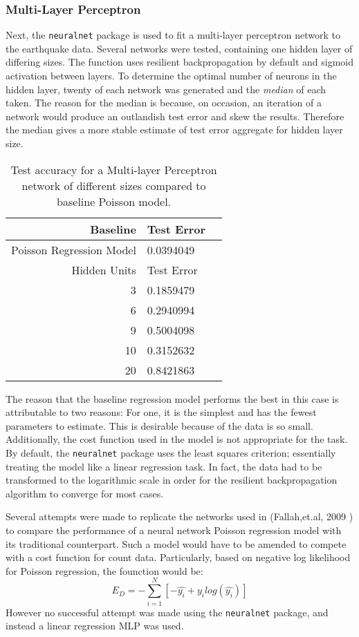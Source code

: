 
\subsubsection{Multi-Layer Perceptron}

Next, the \texttt{neuralnet} package \cite{neuralnet} is used to fit a multi-layer perceptron network to the earthquake data.  Several networks were tested, containing one hidden layer of differing sizes.  The function uses resilient backpropagation by default and sigmoid activation between layers.  To determine the optimal number of neurons in the hidden layer, twenty of each network was generated and the \textit{median} of each taken.  The reason for the median is because, on occasion, an iteration of a network would produce an outlandish test error and skew the results.  Therefore the median gives a more stable estimate of test error aggregate for hidden layer size.


\begin{table}[ht]
\centering
\begin{tabular}{rlr}
  \hline
 Baseline & Test Error \\ 
  \hline
  Poisson Regression Model & 0.0394049 \\ 
  \hline
 Hidden Units & Test Error \\ 
  \hline
3 & 0.1859479 \\ 
  6 & 0.2940994 \\ 
  9 & 0.5004098 \\ 
  10 & 0.3152632 \\ 
  20 & 0.8421863 \\ 
   \hline
\end{tabular}
   \caption{Test accuracy for a Multi-layer Perceptron network of different sizes compared to baseline Poisson model.}
\end{table}

The reason that the baseline regression model performs the best in this case is attributable to two reasons:  For one, it is the simplest and has the fewest parameters to estimate.  This is desirable because of the data is so small.  Additionally, the cost function used in the model is not appropriate for the task.  By default, the \texttt{neuralnet} package uses the least squares criterion; essentially treating the model like a linear regression task.  In fact, the data had to be transformed to the logarithmic scale in order for the resilient backpropagation algorithm to converge for most cases.

Several attempts were made to replicate the networks used in (Fallah,et.al, 2009 \cite{fallah2009nonlinear}) to compare the
performance of a neural network Poisson regression model with its traditional counterpart.  Such a model would have to be amended to compete with a cost function for count data.  Particularly, based on negative log likelihood for Poisson regression, the founction would be:
$$
E_D = - \sum_{i=1}^N \left[ -\hat{y_i} + y_i log(\hat{y_i}) \right]
$$
However no successful attempt was made using the \texttt{neuralnet} package, and instead a linear regression MLP was used.
